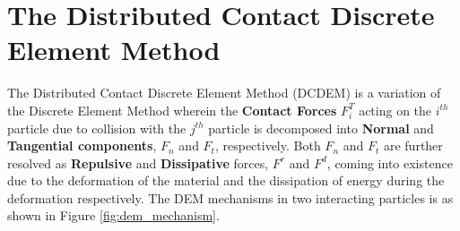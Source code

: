 \chapter{The Distributed Contact Discrete Element Method}

The Distributed Contact Discrete Element Method (DCDEM) \cite{canelas} is a variation of the Discrete Element Method wherein the \textbf{Contact Forces }$F^T_i$  acting on the $i^{th}$ particle due to collision with the $j^{th}$ particle is decomposed into \textbf{Normal} and \textbf{Tangential components}, $F_n$ and $F_t$, respectively. Both $F_n$ and $F_t$ are further resolved as \textbf{Repulsive} and \textbf{Dissipative} forces, $F^r$ and $F^d$, coming into existence due to the deformation of the material and the dissipation of energy during the deformation respectively. The DEM mechanisms in two interacting particles is as shown in Figure \ref{fig:dem_mechanism}.

